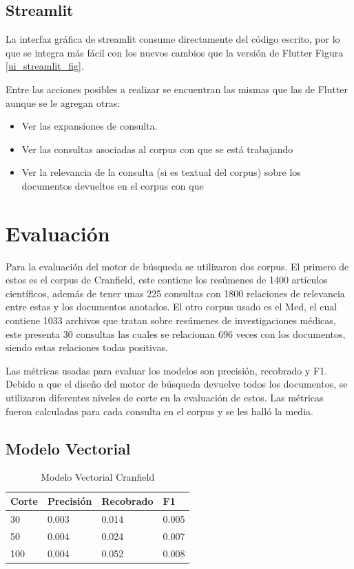 \documentclass[runningheads]{llncs}
\begin{document}
\subsection{Streamlit}

La interfaz gráfica de streamlit consume directamente del código escrito, por lo que se 
integra más fácil con los nuevos cambios que la versión de Flutter Figura \ref{ui_streamlit_fig}.

Entre las acciones posibles a realizar se encuentran las mismas que las de Flutter aunque se le
agregan otras:

\begin{itemize}

\item Ver las expansiones de consulta.
\item Ver las consultas asociadas al corpus con que se está trabajando
\item Ver la relevancia de la consulta (si es textual del corpus) sobre los 
documentos devueltos en el corpus con que

\end{itemize}

\section{Evaluación}

Para la evaluación del motor de búsqueda se utilizaron dos corpus. El primero de estos
es el corpus de Cranfield, este contiene los resúmenes de 1400 artículos científicos, además
de tener unas 225 consultas con 1800 relaciones de relevancia entre estas y los documentos anotados.
El otro corpus usado es el Med, el cual contiene 1033 archivos que tratan sobre resúmenes de investigaciones
médicas, este presenta 30 consultas las cuales se relacionan 696 veces con los documentos, siendo estas
relaciones todas positivas.

Las métricas usadas para evaluar los modelos son precisión, recobrado y F1. Debido a que el diseño del
motor de búsqueda devuelve todos los documentos, se utilizaron diferentes niveles de corte en la evaluación
de estos. Las métricas fueron calculadas para cada consulta en el corpus y se les halló la media.

\subsection{Modelo Vectorial}

\begin{table}
	\caption{Modelo Vectorial Cranfield}\label{cran_vec_result}
 \begin{tabular}{|l|l|l|l|}
 \hline
 	Corte &  Precisión & Recobrado & F1\\
 \hline
	30 & 0.003 & 0.014 & 0.005\\
	50 & 0.004 & 0.024 & 0.007\\
	100 & 0.004 & 0.052 & 0.008\\
 \hline
 \end{tabular}
\end{table}
\end{document}

